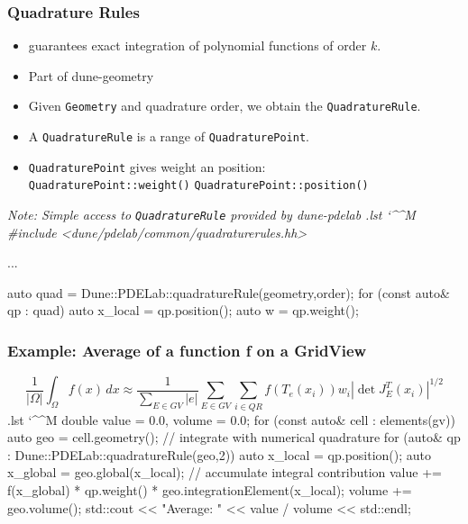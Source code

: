 \documentclass[ignorenonframetext,11pt]{beamer}
\makeatletter
\theoremstyle{definition}
\newenvironment{codeblock}{%
  \begin{tcolorbox}[size=small,oversize,boxrule=0pt,opacityframe=0,colback=blue!30!black!5!white]}{%
  \end{tcolorbox}}
\newenvironment{cppcode}{%
  \begingroup
  \@bsphack
  \immediate\openout\lstvrb@out\jobname.lst
  \let\do\@makeother\dospecials\catcode`\^^M\active
  \def\verbatim@processline{%
    \immediate\write\lstvrb@out{\the\verbatim@line}}%
  \verbatim@start}{%
  \immediate\closeout\lstvrb@out
  \@esphack
  \endgroup
  \begin{codeblock}
    \vspace*{-1ex}
    
    \vspace*{-1ex}
  \end{codeblock}}
\newcommand{\diffd}{\,d}
\makeatother
\begin{document}
\begin{frame}[fragile]
  \frametitle{Quadrature Rules}

  \begin{itemize}
  \item guarantees exact integration of polynomial functions of order $k$.
  \item Part of dune-geometry
  \item Given
    \lstinline!Geometry! and quadrature
    order, we obtain the \lstinline!QuadratureRule!.
  \item A \lstinline!QuadratureRule! is a range of
    \lstinline!QuadraturePoint!.
  \item \lstinline!QuadraturePoint! gives weight an position:\\
    \lstinline!QuadraturePoint::weight()!\hfill
    \lstinline!QuadraturePoint::position()!
  \end{itemize}

  \pause\footnotesize
  \em Note: Simple access to \lstinline!QuadratureRule! provided by
  dune-pdelab\em
\begin{cppcode}
#include <dune/pdelab/common/quadraturerules.hh>

...

auto quad = Dune::PDELab::quadratureRule(geometry,order);
for (const auto& qp : quad)
{
    auto x_local = qp.position();
    auto w = qp.weight();
}
\end{cppcode}

\end{frame}

\begin{frame}[fragile]
\frametitle{Example: Average of a function f on a GridView}
\begin{equation*}
\frac{1}{|\Omega|}\int_{\Omega}f(x) \diffd x\approx\frac{1}{\sum_{E \in GV} |e|}\sum_{E \in GV}\sum_{i \in QR} f(T_e(x_i)) w_i |\det J_E^T(x_i)|^{1/2}
\end{equation*}
\begin{cppcode}
double value = 0.0, volume = 0.0;
for (const auto& cell : elements(gv)) {
  auto geo = cell.geometry();
  // integrate with numerical quadrature
  for (auto& qp : Dune::PDELab::quadratureRule(geo,2)) {
    auto x_local = qp.position();
    auto x_global = geo.global(x_local);
    // accumulate integral contribution
    value += f(x_global) *
             qp.weight() * geo.integrationElement(x_local);
  }
  volume += geo.volume();
}
std::cout << "Average: " << value / volume << std::endl;
\end{cppcode}

\end{frame}
\end{document}
